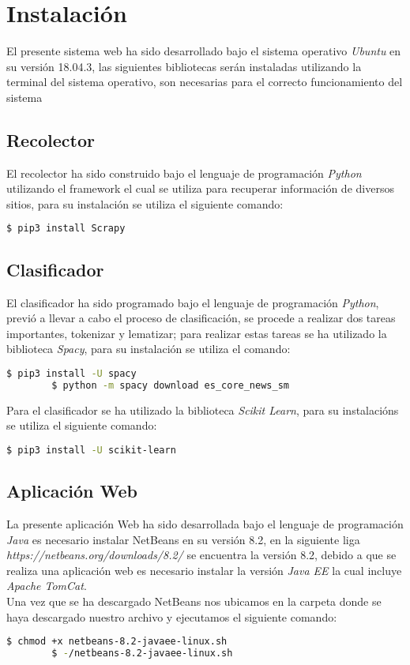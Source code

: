\section{Instalación}

	El presente sistema web ha sido desarrollado bajo el sistema operativo \textit{Ubuntu} en su versión 18.04.3, las siguientes bibliotecas serán instaladas utilizando la terminal del sistema operativo, son necesarias para el correcto funcionamiento del sistema
	\subsection{Recolector}
	El recolector ha sido construido bajo el lenguaje de programación \textit{Python} utilizando el framework  el cual se utiliza para recuperar información de diversos sitios, para su instalación se utiliza el siguiente comando:
	\begin{lstlisting}[language=bash]
  		$ pip3 install Scrapy
	\end{lstlisting}

	\subsection{Clasificador}
	El clasificador ha sido programado bajo el lenguaje de programación \textit{Python}, previó a llevar a cabo el proceso de clasificación, se procede a realizar dos tareas importantes, tokenizar y lematizar; para realizar estas tareas se ha utilizado la biblioteca \textit{Spacy}, para su instalación se utiliza el comando:
	\begin{lstlisting}[language=bash]
  		$ pip3 install -U spacy
  		$ python -m spacy download es_core_news_sm
	\end{lstlisting}

	Para el clasificador se ha utilizado la biblioteca \textit{Scikit Learn}, para su instalacións se utiliza el siguiente comando:
	\begin{lstlisting}[language=bash]
		$ pip3 install -U scikit-learn
	\end{lstlisting}

	\subsection{Aplicación Web}
	La presente aplicación Web ha sido desarrollada bajo el lenguaje de programación \textit{Java} es necesario instalar NetBeans en su versión 8.2, en la siguiente liga \textit{https://netbeans.org/downloads/8.2/} se encuentra la versión 8.2, debido a que se realiza una aplicación web es necesario instalar la versión \textit{Java EE} la cual incluye \textit{Apache TomCat}.
	\\
	Una vez que se ha descargado NetBeans nos ubicamos en la carpeta donde se haya descargado nuestro archivo y ejecutamos el siguiente comando:
	\begin{lstlisting}[language=bash]
		$ chmod +x netbeans-8.2-javaee-linux.sh 
		$ -/netbeans-8.2-javaee-linux.sh 
	\end{lstlisting}


